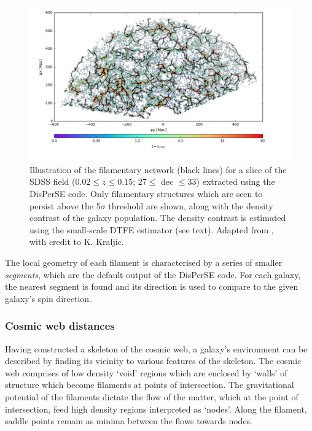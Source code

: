 \begin{figure}
    \centering
	\includegraphics[width=\linewidth]{thesis/latex/halo_assembly_manga/SDSS_CW_DisPerSE.pdf}
    \caption[Illustration of the filamentary network for a slice of the SDSS field.]{Illustration of the filamentary network (black lines) for a slice of the SDSS field ($0.02 \leq z \leq 0.15$; $ 27 \leq$ dec $\leq 33$) extracted using the DisPerSE code. Only filamentary structures which are seen to persist above the 5$\sigma$ threshold are shown, along with the density contrast of the galaxy population. The density contrast is estimated using the small-scale DTFE estimator (see text). Adapted from \citet{duckworth2019_halo}, with credit to K. Kraljic.}
    \label{fig:disperse_sdss}
\end{figure}

The local geometry of each filament is characterised by a series of smaller \textit{segments}, which are the default output of the DisPerSE code. For each galaxy, the nearest segment is found and its direction is used to compare to the given galaxy's spin direction. 

\subsubsection{Cosmic web distances} \label{sec:cosmic_web_distances}
Having constructed a skeleton of the cosmic web, a galaxy's environment can be described by finding its vicinity to various features of the skeleton. The cosmic web comprises of low density `void' regions which are enclosed by `walls' of structure which become filaments at points of intersection. The gravitational potential of the filaments dictate the flow of the matter, which at the point of intersection, feed high density regions interpreted as `nodes'. Along the filament, saddle points remain as minima between the flows towards nodes.  

